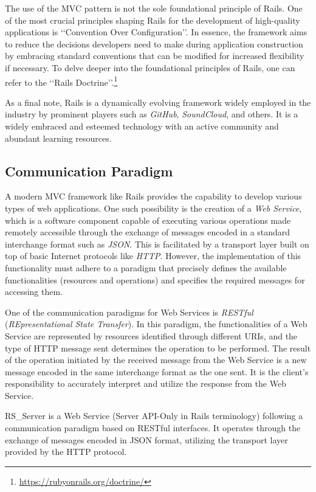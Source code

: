 \documentclass[a4paper, english]{article}
\newcommand{\rsserver}{RS\_Server\xspace}
\begin{document}
The use of the MVC pattern is not the sole foundational principle of Rails. One of the most crucial principles shaping Rails for the development of high-quality applications is \lq\lq Convention Over Configuration\rq\rq{}. In essence, the framework aims to reduce the decisions developers need to make during application construction by embracing standard conventions that can be modified for increased flexibility if necessary. To delve deeper into the foundational principles of Rails, one can refer to the \lq\lq Rails Doctrine\rq\rq{}.\footnote{\url{https://rubyonrails.org/doctrine/}}

As a final note, Rails is a dynamically evolving framework widely employed in the industry by prominent players such as \emph{GitHub}, \emph{SoundCloud}, and others. It is a widely embraced and esteemed technology with an active community and abundant learning resources.

\subsection{Communication Paradigm}

A modern MVC framework like Rails provides the capability to develop various types of web applications. One such possibility is the creation of a \emph{Web Service}, which is a software component capable of executing various operations made remotely accessible through the exchange of messages encoded in a standard interchange format such as \emph{JSON}. This is facilitated by a transport layer built on top of basic Internet protocols like \emph{HTTP}. However, the implementation of this functionality must adhere to a paradigm that precisely defines the available functionalities (resources and operations) and specifies the required messages for accessing them.

One of the communication paradigms for Web Services is \emph{RESTful} (\emph{REpresentational State Transfer}). In this paradigm, the functionalities of a Web Service are represented by resources identified through different URIs, and the type of HTTP message sent determines the operation to be performed. The result of the operation initiated by the received message from the Web Service is a new message encoded in the same interchange format as the one sent. It is the client's responsibility to accurately interpret and utilize the response from the Web Service.

\rsserver is a Web Service (Server API-Only in Rails terminology) following a communication paradigm based on RESTful interfaces. It operates through the exchange of messages encoded in JSON format, utilizing the transport layer provided by the HTTP protocol.
\end{document}
